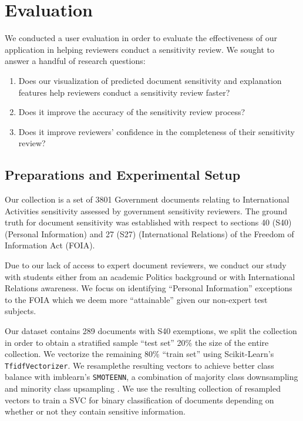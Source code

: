 \documentclass{l4proj}
\begin{document}
\chapter{Evaluation}

We conducted a user evaluation in order to evaluate the effectiveness of our application in helping reviewers conduct a sensitivity review. We sought to answer a handful of research questions:

\begin{enumerate}[label=\textbf{RQ\arabic*}]
    \item Does our visualization of predicted document sensitivity and explanation features help reviewers conduct a sensitivity review faster?
    \item Does it improve the accuracy of the sensitivity review process?
    \item Does it improve reviewers' confidence in the completeness of their sensitivity review?
\end{enumerate}



\section{Preparations and Experimental Setup}

Our collection is a set of 3801 Government documents relating to International Activities sensitivity assessed by government sensitivity reviewers.
The ground truth for document sensitivity was established with respect to sections 40 (S40) (Personal Information) and 27 (S27) (International Relations) of the Freedom of Information Act (FOIA).

Due to our lack of access to expert document reviewers, we conduct our study with students either from an academic Politics background or with International Relations awareness.
We focus on identifying ``Personal Information'' exceptions to the FOIA which we deem more ``attainable'' given our non-expert test subjects.

Our dataset contains 289 documents with S40 exemptions, we split the collection in order to obtain a stratified sample ``test set'' 20\% the size of the entire collection.
We vectorize the remaining 80\% ``train set'' using Scikit-Learn's \verb|TfidfVectorizer|.
We resamplethe resulting vectors to achieve better class balance with imblearn's \verb|SMOTEENN|, a combination of majority class downsampling and minority class upsampling \autocite{lemaitreImbalancedlearnPythonToolbox2017}.
We use the resulting collection of resampled vectors to train a SVC for binary classification of documents depending on whether or not they contain sensitive information.
\end{document}
